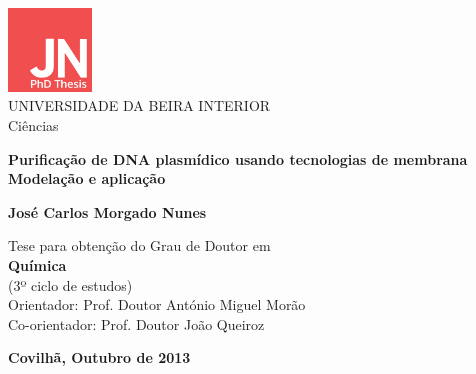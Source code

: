 \begin{titlepage}
\begin{center}

\begin{flushleft}
\includegraphics[height=2.22cm]{logo}\\
\rostoubi UNIVERSIDADE DA BEIRA INTERIOR\\
\rostofac Ciências\\
\end{flushleft}

\vspace{7.6cm}

\rostotitulo \textbf{Purificação de DNA plasmídico usando tecnologias de membrana} \\
\rostosubtit \textbf{Modelação e aplicação}\\

\vspace{1.8cm}

\rostonomes \textbf{José Carlos Morgado Nunes}\\

\vspace{1.4cm}

\rostooutros Tese para obtenção do Grau de Doutor em\\
\rostonomes \textbf{Química}\\
\rostooutros (3º ciclo de estudos)\\

\vspace{3cm}
\rostooutros Orientador: Prof. Doutor António Miguel Morão\\
Co-orientador: Prof. Doutor João Queiroz\\

\vspace{1.2cm}

\rostooutros \textbf{Covilhã, Outubro de 2013}

\end{center}
\end{titlepage}

